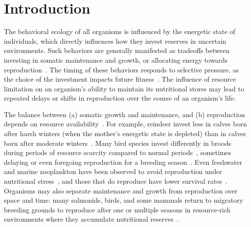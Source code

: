 \documentclass[twocolumn,preprintnumbers,amsmath,amssymb,superscriptaddress]{revtex4}
\begin{document}


\maketitle

\section*{Introduction}
The behavioral ecology of all organisms is influenced by the energetic state
of individuals, which directly influences how they invest reserves in
uncertain environments.  Such behaviors are generally manifested as tradeoffs
between investing in somatic maintenance and growth, or allocating energy
towards reproduction~\cite{Martin:1987dl,Kirk:1997cc,Kempes:2012hy}.  The
timing of these behaviors responds to selective pressure, as the choice of
the investment impacts future
fitness~\cite{Mangel:1988uaa,Mangel:2014kz,Yeakel:2013hi}.  The influence of
resource limitation on an organism's ability to maintain its nutritional
stores may lead to repeated delays or shifts in reproduction over the course
of an organism's life.

The balance between (a) somatic growth and maintenance, and (b) reproduction
depends on resource availability~\cite{Morris:1987eo}.  For example, reindeer
invest less in calves born after harsh winters (when the mother's energetic
state is depleted) than in calves born after moderate
winters~\cite{Tveraa:2003fq}.  Many bird species invest differently in broods
during periods of resource scarcity compared to normal
periods~\cite{Daan:1988va,Jacot:2009dv}, sometimes delaying or even foregoing
reproduction for a breeding
season~\cite{Martin:1987dl,Stearns:1989ip,Barboza:2002in}.  Even freshwater
and marine zooplankton have been observed to avoid reproduction under
nutritional stress~\cite{Threlkeld:1976ih}, and those that do reproduce have
lower survival rates~\cite{Kirk:1997cc}.  Organisms may also separate
maintenance and growth from reproduction over space and time: many salmonids,
birds, and some mammals return to migratory breeding grounds to reproduce
after one or multiple seasons in resource-rich environments where they
accumulate nutritional
reserves~\cite{Weber:1998jg,Mduma:1999cp,Moore:2014hi}.
\end{document}
